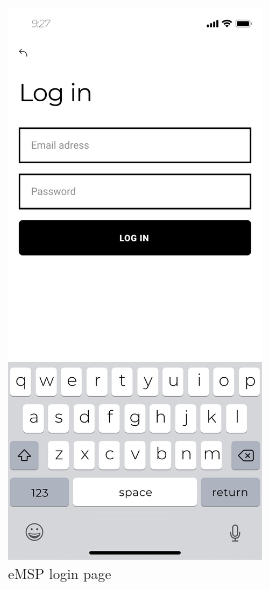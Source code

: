 \documentclass{Configuration_Files/PoliMi3i_thesis}
\begin{document}
\begin{figure}[H]
    \centering
    \includegraphics[width=0.6\textwidth]{Images/user-interface/emsp/eMSP (1)-04.png}
    \caption{eMSP login page}
\end{figure}
\end{document}
